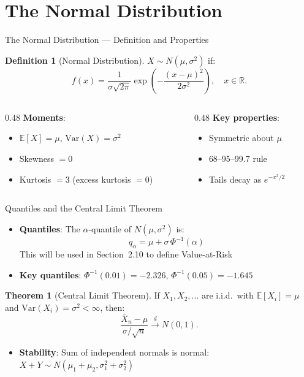 \documentclass[9pt, aspectratio=169, t]{beamer}
\theoremstyle{definition}
\newtheorem{defn}{Definition}
\newtheorem{thm}{Theorem}
\newcommand{\E}{\mathbb{E}}
\newcommand{\Var}{\text{Var}}
\newcommand{\R}{\mathbb{R}}
\begin{document}
\section{The Normal Distribution}

\begin{frame}{The Normal Distribution --- Definition and Properties}
\begin{defn}[Normal Distribution]
$X \sim N(\mu, \sigma^2)$ if:
\[
f(x) = \frac{1}{\sigma\sqrt{2\pi}}\exp\!\left(-\frac{(x-\mu)^2}{2\sigma^2}\right), \quad x \in \R.
\]
\end{defn}

\begin{columns}[T]
\begin{column}{0.48\textwidth}
\textbf{Moments}:
\begin{itemize}
\item $\E[X] = \mu$, \quad $\Var(X) = \sigma^2$
\item Skewness $= 0$
\item Kurtosis $= 3$ (excess kurtosis $= 0$)
\end{itemize}
\end{column}
\begin{column}{0.48\textwidth}
\textbf{Key properties}:
\begin{itemize}
\item Symmetric about $\mu$
\item 68--95--99.7 rule
\item Tails decay as $e^{-x^2/2}$
\end{itemize}
\end{column}
\end{columns}
\end{frame}

\begin{frame}{Quantiles and the Central Limit Theorem}
\begin{itemize}
\item \textbf{Quantiles}: The $\alpha$-quantile of $N(\mu, \sigma^2)$ is:
\[
q_\alpha = \mu + \sigma\,\Phi^{-1}(\alpha)
\]
This will be used in Section~2.10 to define Value-at-Risk
\item \textbf{Key quantiles}: $\Phi^{-1}(0.01) = -2.326$, \quad $\Phi^{-1}(0.05) = -1.645$
\end{itemize}

\vspace{0.2cm}
\begin{thm}[Central Limit Theorem]
If $X_1, X_2, \ldots$ are i.i.d.\ with $\E[X_i] = \mu$ and $\Var(X_i) = \sigma^2 < \infty$, then:
\[
\frac{\bar{X}_n - \mu}{\sigma/\sqrt{n}} \xrightarrow{d} N(0,1).
\]
\end{thm}

\begin{itemize}
\item \textbf{Stability}: Sum of independent normals is normal: $X + Y \sim N(\mu_1+\mu_2, \sigma_1^2+\sigma_2^2)$
\end{itemize}
\end{frame}
\end{document}
